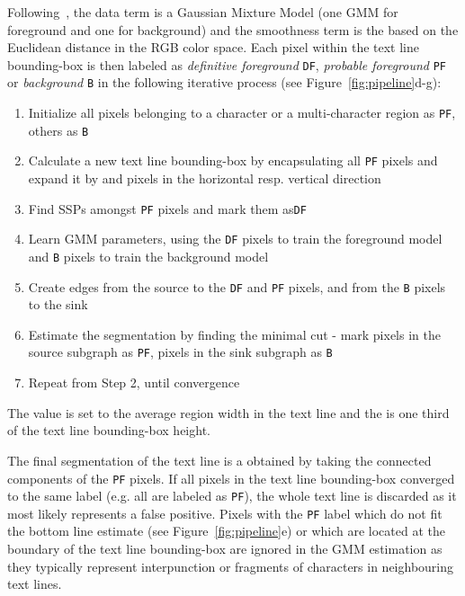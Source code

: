 \documentclass[conference]{IEEEtran}
\begin{document}
Following~\cite{rother2004grabcut}, the data term is a Gaussian Mixture Model (one GMM for foreground and one for background) and the smoothness term is the based on the Euclidean distance in the RGB color space. Each pixel within the text line bounding-box is then labeled as \emph{definitive foreground} \texttt{DF}, \emph{probable foreground} \texttt{PF} or \emph{background} \texttt{B} in the following iterative process (see Figure~\ref{fig:pipeline}d-g):
\begin{enumerate}
  \item Initialize all pixels belonging to a character or a multi-character region as \texttt{PF}, others as \texttt{B}
  \item Calculate a new text line bounding-box by encapsulating all \texttt{PF} pixels and expand it by  and  pixels in the horizontal resp. vertical direction
  \item Find SSPs amongst \texttt{PF} pixels and mark them as\texttt{DF}
  \item Learn GMM parameters, using the \texttt{DF} pixels to train the foreground model and \texttt{B} pixels to train the background model
  \item Create edges from the source to the \texttt{DF} and \texttt{PF} pixels, and from the \texttt{B} pixels to the sink
  \item Estimate the segmentation by finding the minimal cut - mark pixels in the source subgraph as \texttt{PF}, pixels in the sink subgraph as \texttt{B}
  \item Repeat from Step 2, until convergence
\end{enumerate}

The value  is set to the average region width in the text line and the  is one third of the text line bounding-box height. 

The final segmentation of the text line is a obtained by taking the connected components of the \texttt{PF} pixels. If all pixels in the text line bounding-box converged to the same label (e.g. all are labeled as \texttt{PF}), the whole text line is discarded as it most likely represents a false positive. Pixels with the \texttt{PF} label which do not fit the bottom line estimate (see Figure~\ref{fig:pipeline}e) or which are located at the boundary of the text line bounding-box are ignored in the GMM estimation as they typically represent interpunction or fragments of characters in neighbouring text lines.
\end{document}

